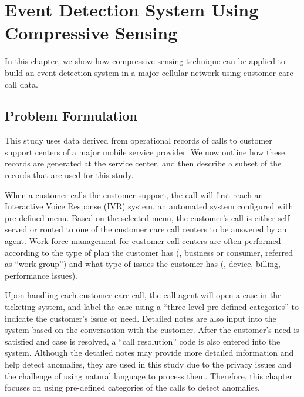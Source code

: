 \chapter{Event Detection System Using Compressive Sensing}
\label{chp:event-det}

In this chapter, we show how compressive sensing technique can be applied to build an event detection system in a major cellular network using customer care call data. 

\section{Problem Formulation}
\label{sec:problem-formulation}

 This study uses data derived from operational
records of calls to customer support centers of a major mobile service
provider. We now outline how these records are generated at the
service center, and then describe a subset of the records that are
used for this study. 

When a customer calls the customer support,
the call will first reach an Interactive Voice Response (IVR)
system, an automated system configured with
pre-defined menu. Based on the selected menu, the customer's call
is either self-served
or routed to one of the customer care call centers to be answered by an agent.
Work force management for customer call centers are often performed
according to the type of plan the customer has (\eg, business or
consumer, referred as ``work group'') and what type
of issues the customer has (\eg, device, billing, performance
issues). 

Upon handling each customer care call, the call agent will
open a case in the ticketing system, and
label the case using a ``three-level pre-defined categories'' to indicate
the customer's issue or need. 
Detailed notes are also input into
the system based on the conversation with the customer. After the
customer's need is satisfied and case is resolved, a ``call resolution'' code
is also entered into the system.  
Although the detailed notes may provide more detailed information and
help detect anomalies, 
they are used in this study due to the privacy
issues and the challenge of using natural language to process them.
Therefore, this chapter focuses on using pre-defined categories of the calls to
detect anomalies. 



